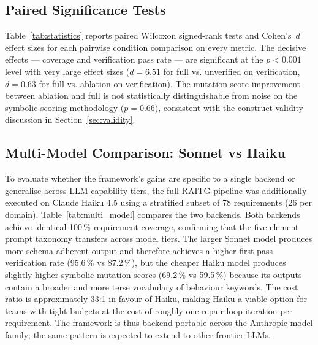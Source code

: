 \documentclass[11pt,letterpaper]{article}
\begin{document}
\begin{table}[!t]
\centering
\caption{Bootstrap 95\,\% confidence intervals (5{,}000 resamples)}
\label{tab:bootstrap_ci}


\end{table}

\subsection{Paired Significance Tests}

Table~\ref{tab:statistics} reports paired Wilcoxon signed-rank tests and Cohen's~$d$ effect sizes for each pairwise condition comparison on every metric. The decisive effects --- coverage and verification pass rate --- are significant at the $p < 0.001$ level with very large effect sizes ($d = 6.51$ for full vs. unverified on verification, $d = 0.63$ for full vs. ablation on verification). The mutation-score improvement between ablation and full is not statistically distinguishable from noise on the symbolic scoring methodology ($p = 0.66$), consistent with the construct-validity discussion in Section~\ref{sec:validity}.

\begin{table}[!t]
\centering
\caption{Pairwise Wilcoxon signed-rank + Cohen's $d$ (n = 312 per condition)}
\label{tab:statistics}


\end{table}

\subsection{Multi-Model Comparison: Sonnet vs Haiku}
\label{sec:multi_model}

To evaluate whether the framework's gains are specific to a single backend or generalise across LLM capability tiers, the full RAITG pipeline was additionally executed on Claude Haiku 4.5 using a stratified subset of 78 requirements (26 per domain). Table~\ref{tab:multi_model} compares the two backends. Both backends achieve identical 100\,\% requirement coverage, confirming that the five-element prompt taxonomy transfers across model tiers. The larger Sonnet model produces more schema-adherent output and therefore achieves a higher first-pass verification rate (95.6\,\% vs 87.2\,\%), but the cheaper Haiku model produces slightly higher symbolic mutation scores (69.2\,\% vs 59.5\,\%) because its outputs contain a broader and more terse vocabulary of behaviour keywords. The cost ratio is approximately 33:1 in favour of Haiku, making Haiku a viable option for teams with tight budgets at the cost of roughly one repair-loop iteration per requirement. The framework is thus backend-portable across the Anthropic model family; the same pattern is expected to extend to other frontier LLMs.
\end{document}
